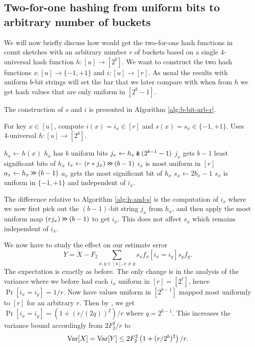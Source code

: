 \subsection{Two-for-one hashing from uniform bits to arbitrary number of buckets}
We will now briefly discuss how would get the two-for-one hash
functions in count sketches with an arbitrary number $r$ of buckets based
on a single $4$-universal hash function $h:[u]\to [2^b]$.  We want to
construct the two hash functions $s:[u]\to\{-1,+1\}$ and
$i:[u]\to[r]$. As usual the results with uniform $b$-bit strings will
set the bar that we later compare with when from $h$ we get hash values that
are only uniform in $[2^b-1]$.

The construction of $s$ and $i$ is presented in 
Algorithm \ref{alg:b-bit-arb-r}.
\begin{algorithm}[H]
   \caption{For key $x\in [u]$, compute $i(x)=i_x\in[r]$ and $s(x)=s_x\in\{-1,+1\}$.
   \newline
    Uses 4-universal $h:[u]\to [2^b]$.}
   \label{alg:b-bit-arb-r}
   \begin{algorithmic}
      \State $h_x\gets h(x)$
      \Comment $h_x$ has $b$ uniform bits
      \State $j_x\gets h_x\mathbin{\texttt{\&}}(2^{b-1}-1)$
      \Comment $j_x$ gets $b-1$ least significant bits of $h_x$
      \State $i_x\gets (r*j_x)\mathbin{\texttt{>\!>}} (b-1)$
      \Comment $i_x$ is most uniform in $[r]$
      \State $a_x\gets h_x\mathbin{\texttt{>\!>}} (b-1)$
      \Comment $a_x$ gets the most significant bit of $h_x$
      \State $s_x\gets 2b_x-1$
      \Comment $s_x$ is uniform in $\{-1,+1\}$ and independent of $i_x$.
   \end{algorithmic}
\end{algorithm}
The difference relative to Algorithm \ref{alg:h-and-s} is the computation
of $i_x$ where we now first pick out the $(b-1)$-bit string $j_x$ from
$h_x$, and then apply the most uniform map $(rj_x)\mathbin{\texttt{>\!>}} (b-1)$
to get $i_x$. This does not affect $s_x$ which remains independent
of $i_x$. 

We now have to study the effect on our estimate error
\[Y=X-F_2\sum_{x,y\in[u],x\neq y} s_x f_x[i_x=i_y]s_y f_y.\]
The expectation is exactly as before. The only
change is in the analysis of the variance where
we before had each $i_x$ uniform in $[r]=[2^\ell]$, hence
$\Pr[i_x=i_y]=1/r$. Now have values uniform in $[2^{b-1}]$ mapped
most uniformly to $[r]$ for an arbitrary $r$. Then by ,
we get $\Pr[i_x=i_y]=\left(1+(r/(2q))^2\right)/r$ where $q=2^{b-1}$. 
This increases
the variance bound accordingly from $2F_2^2/r$ to
\begin{equation}\label{eq:Var-b-bit-arb-r}
   \operatorname*{Var}[X]=\operatorname*{Var}[Y]\leq 2F_2^2\left(1+(r/2^b)^2\right)/r.
\end{equation}

